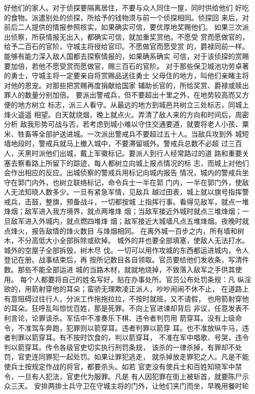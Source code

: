 \documentclass[12pt,UTF8]{ctexbook}
\begin{document}
好他们的家人。对于侦探要隔离居住，不要与众人同住一屋，同时供给他们 
好吃的食物。派遣别处的侦探，所给予的钱物须与前一个侦探相同。侦探回 
来后，对前后二人提供的情报参照核实，如果确实可信，要优厚地奖赐他们。 
如果三次派出侦察，所获情报无出入，都确实可信，就加重奖赏他。不愿受 
赏而愿做官的，给予二百石的官阶，守城主将授给官印。不愿做官而愿受赏 
的，爵禄同前一样。能够有能力深入敌人国都去探察情报的，如果确系确实 
可信，对于该侦探的赏赐要加倍，若他不愿受赏而愿做官，赐三百石的官阶。 
对于那些保卫城池功劳卓著的勇士，守城主将一定要亲自将赏赐品送往勇士 
父母住的地方，叫他们亲睹主将对他的恩宠。对那些把赏赐再度捐献给国家 
辅助长官的，所给奖赏、爵禄或赎出罪人的数量分别加倍。 
要派出警戒兵，但不要超出十里之外，在地势较高而又方便的地方树立 
标志，派三人看守。从最远的地方到城邑共树立三处标志，同城上烽火遥遥 
相望。白天就烧烟，晚上就点火。弄清了敌人来的方向和时间后，周密分析 
敌我形势可战与否，若考虑到城小难以守住交通要道，就要将老人小孩、粟 
米、牲畜等全部护送进城。一次派出警戒兵不要超过五十人。当敌兵攻到外 
城短墙地段时，警戒兵就马上撤入城中，不要滞留城外。警戒兵总数不必超 
过三百人，天黑时派他们出城，戴上军徽标记。要派人到行人经常路过的道 
路和重要关塞去察看路上所留下的踪迹，每人都树立向城上报点情况的标 
志，而城上对他们会作出相应的反应。出城侦察的警戒兵用标记向城内报告 
情况，城内的警戒兵坐守在郭门内外，也树立联络标记，命令兵士一半在郭 
门内，一半在郭门外，使敌人无法知晓人数多少。一旦有紧急军情，见敌兵 
越过田表，城上就以旗号指挥警戒兵，击鼓，整旗，预备战斗，一切都按城 
上指挥行事。看得见敌军，就点一堆烽烟；敌军进入我方境界，就点两堆烽 
烟；当敌军接近外城时就点三堆烽烟；一旦敌军进入外城内，就点燃四堆烽 
烟；敌军接近大城墙凡点五堆烽烟。夜晚时就点烽火，报告敌情的烽火数目 
与烽烟相同。 
在离外城一百步之内，所有墙和树木，不分高低大小全部拆除或砍掉。 
城外的井也要全部填塞，使敌人无法打水。城外的空屋子全部拆毁，树木尽 
伐。一切可以用作攻城的东西都运进城内，令人登记在册。战事结束后，再 
按所记数目各自领取。官员要给他们发收条，写清件数。那些不能全部运进 
城的当路木材，就就地烧掉，不致落入敌军之手供其使用。 
每个人都要将自己的姓名写好，贴在办事处所。官员公布处罚条规：凡 
纵淫欲的，用箭射穿他的耳朵；蛮骄无理欺凌正派人，吵吵闹闹不休不止， 
在道路上有意阻碍过往行人，分派工作拖拖拉拉，不按时就班，又不请假， 
也用箭射穿他的耳朵。狂呼乱叫惊忧百姓，那是死罪。不向上官进谏却背后 
非议，任意发表不利言论，论罪该杀。军伍中不准奏乐下棋、违令者判罚用 
箭穿耳。没有上级命令，不准驾车奔跑，犯罪则以箭穿耳。违者判罪以箭穿 
耳。也不准放纵牛马，违者判罪以箭穿耳。有不按时饮食的，判以箭穿耳， 
不准在军中唱歌、号哭，违令判以箭穿耳。传令各级官吏切实执行刑罚条规， 
该杀的一律杀掉，有罪却不处罚，官吏连同罪犯一起处罚。如果让罪犯逃走， 
就杀掉放走罪犯之人。凡是不能使兵士按规定作战的将官，都要杀头。如若 
官吏没有使兵士和百姓知晓军中禁令，一旦有人犯法，官吏代为服罪。凡是 
有人因犯罪在街上被斩首，就要陈尸示众三天。 
安排两排士兵守卫在守城主将的门外，让他们夹门而坐，早晚用餐时轮 
\end{document}
